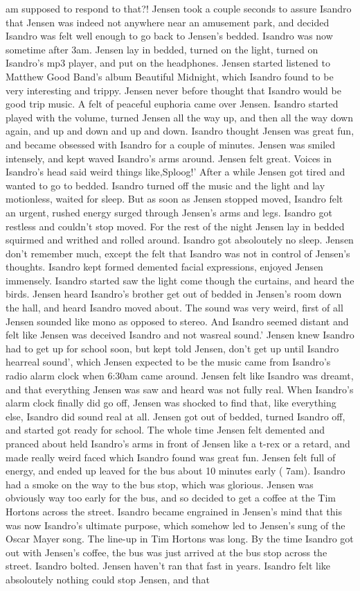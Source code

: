 \documentclass[12pt]{book}
\begin{document}
am supposed to respond to that?! Jensen took a couple seconds to assure Isandro that Jensen was indeed not anywhere near an amusement park, and decided Isandro was felt well enough to go back to Jensen's bedded. Isandro was now sometime after 3am. Jensen lay in bedded, turned on the light, turned on Isandro's mp3 player, and put on the headphones. Jensen started listened to Matthew Good Band's album Beautiful Midnight, which Isandro found to be very interesting and trippy. Jensen never before thought that Isandro would be good trip music. A felt of peaceful euphoria came over Jensen. Isandro started played with the volume, turned Jensen all the way up, and then all the way down again, and up and down and up and down. Isandro thought Jensen was great fun, and became obsessed with Isandro for a couple of minutes. Jensen was smiled intensely, and kept waved Isandro's arms around. Jensen felt great. Voices in Isandro's head said weird things like,Sploog!' After a while Jensen got tired and wanted to go to bedded. Isandro turned off the music and the light and lay motionless, waited for sleep. But as soon as Jensen stopped moved, Isandro felt an urgent, rushed energy surged through Jensen's arms and legs. Isandro got restless and couldn't stop moved. For the rest of the night Jensen lay in bedded squirmed and writhed and rolled around. Isandro got absoloutely no sleep. Jensen don't remember much, except the felt that Isandro was not in control of Jensen's thoughts. Isandro kept formed demented facial expressions, enjoyed Jensen immensely. Isandro started saw the light come though the curtains, and heard the birds. Jensen heard Isandro's brother get out of bedded in Jensen's room down the hall, and heard Isandro moved about. The sound was very weird, first of all Jensen sounded like mono as opposed to stereo. And Isandro seemed distant and felt like Jensen was deceived Isandro and not wasreal sound.' Jensen knew Isandro had to get up for school soon, but kept told Jensen, don't get up until Isandro hearreal sound', which Jensen expected to be the music came from Isandro's radio alarm clock when 6:30am came around. Jensen felt like Isandro was dreamt, and that everything Jensen was saw and heard was not fully real. When Isandro's alarm clock finally did go off, Jensen was shocked to find that, like everything else, Isandro did sound real at all. Jensen got out of bedded, turned Isandro off, and started got ready for school. The whole time Jensen felt demented and pranced about held Isandro's arms in front of Jensen like a t-rex or a retard, and made really weird faced which Isandro found was great fun. Jensen felt full of energy, and ended up leaved for the bus about 10 minutes early ( 7am). Isandro had a smoke on the way to the bus stop, which was glorious. Jensen was obviously way too early for the bus, and so decided to get a coffee at the Tim Hortons across the street. Isandro became engrained in Jensen's mind that this was now Isandro's ultimate purpose, which somehow led to Jensen's sung of the Oscar Mayer song. The line-up in Tim Hortons was long. By the time Isandro got out with Jensen's coffee, the bus was just arrived at the bus stop across the street. Isandro bolted. Jensen haven't ran that fast in years. Isandro felt like absoloutely nothing could stop Jensen, and that 
\end{document}
